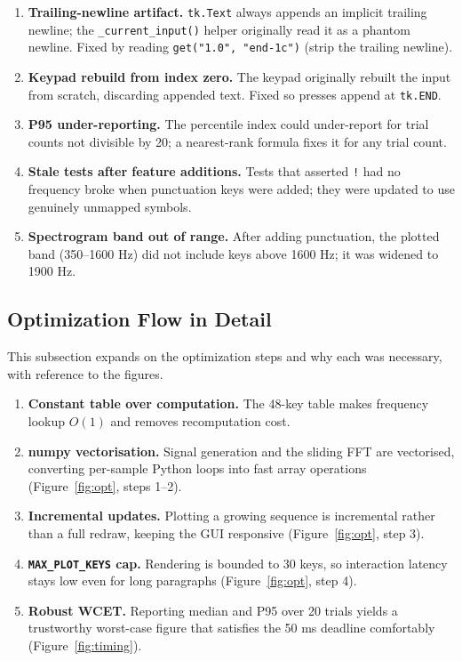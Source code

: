 \documentclass[11pt,a4paper]{article}
\begin{document}
\begin{enumerate}
    \item \textbf{Trailing-newline artifact.} \texttt{tk.Text} always appends
          an implicit trailing newline; the \texttt{\_current\_input()}
          helper originally read
          it as a phantom newline. Fixed by reading
          \texttt{get("1.0", "end-1c")}
          (strip the trailing newline).
    \item \textbf{Keypad rebuild from index zero.} The keypad originally
          rebuilt the input from scratch, discarding appended text. Fixed so
          presses append at \texttt{tk.END}.
    \item \textbf{P95 under-reporting.} The percentile index could
          under-report for trial counts not divisible by 20; a nearest-rank
          formula fixes it for any trial count.
    \item \textbf{Stale tests after feature additions.} Tests that asserted
          \texttt{!} had no frequency broke when punctuation keys were added;
          they were updated to use genuinely unmapped symbols.
    \item \textbf{Spectrogram band out of range.} After adding punctuation, the
          plotted band (350--1600 Hz) did not include keys above 1600 Hz; it was
          widened to 1900 Hz.
\end{enumerate}

\subsection{Optimization Flow in Detail}
\label{sec:optflow}

This subsection expands on the optimization steps and why each was necessary,
with reference to the figures.

\begin{enumerate}
    \item \textbf{Constant table over computation.} The 48-key table makes
          frequency lookup $O(1)$ and removes recomputation cost.
    \item \textbf{numpy vectorisation.} Signal generation and the sliding FFT
          are vectorised, converting per-sample Python loops into fast array
          operations (Figure~\ref{fig:opt}, steps 1--2).
    \item \textbf{Incremental updates.} Plotting a growing sequence is
          incremental rather than a full redraw, keeping the GUI responsive
          (Figure~\ref{fig:opt}, step 3).
    \item \textbf{\texttt{MAX\_PLOT\_KEYS} cap.} Rendering is bounded to 30
          keys, so interaction latency stays low even for long paragraphs
          (Figure~\ref{fig:opt}, step 4).
    \item \textbf{Robust WCET.} Reporting median and P95 over 20 trials yields a
          trustworthy worst-case figure that satisfies the 50 ms deadline
          comfortably (Figure~\ref{fig:timing}).
\end{enumerate}
\end{document}
